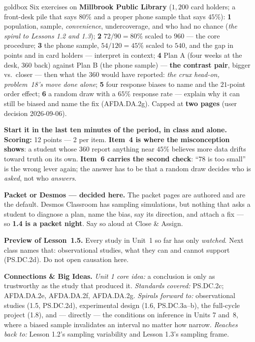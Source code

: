\documentclass[10pt]{article}
\begin{document}
\boxguard
\begin{skillbox}{goldbox}
Six exercises on \textbf{Millbrook Public Library} ($1{,}200$ card holders; a front-desk pile
that says $80\%$ and a proper phone sample that says $45\%$): \textbf{1} population, sample,
\emph{convenience}, undercoverage, and who had no chance (\emph{the spiral to Lessons 1.2 and
1.3}); \textbf{2} $72/90 = 80\%$ scaled to $960$ --- the core procedure; \textbf{3} the phone
sample, $54/120 = 45\%$ scaled to $540$, and the gap in points and in card holders ---
interpret in context; \textbf{4} Plan A (four weeks at the desk, $360$ back) against Plan B
(the phone sample) --- \textbf{the contrast pair}, bigger vs.\ closer --- then what the $360$
would have reported: \emph{the crux head-on, problem~18's move done alone}; \textbf{5} four response biases to name and the
$21$-point order effect; \textbf{6} a random draw with a $65\%$ response rate --- explain why
it can still be biased and name the fix (AFDA.DA.2g). Capped at \textbf{two pages} (user
decision 2026-09-06).

\textbf{Start it in the last ten minutes of the period, in class and alone.} \textbf{Scoring:}
12 points --- 2 per item. \textbf{Item~4 is where the misconception shows}: a student whose
$360$ report anything near $45\%$ believes more data drifts toward truth on its own.
\textbf{Item~6 carries the second check}: ``$78$ is too small'' is the wrong lever again; the
answer has to be that a random draw decides who is \emph{asked}, not who \emph{answers}.

\textbf{Packet or Desmos --- decided here.} The packet pages are authored and are the default.
Desmos Classroom has sampling simulations, but nothing that asks a student to diagnose a
plan, name the bias, say its direction, and attach a fix --- so \textbf{1.4 is a packet
night}. Say so aloud at Close \& Assign.

\textbf{Preview of Lesson~1.5.} Every study in Unit~1 so far has only \emph{watched}. Next
class names that: observational studies, what they can and cannot support (PS.DC.2d). Do not
open causation here.

\textbf{Connections \& Big Ideas.} \textit{Unit 1 core idea:} a conclusion is only as
trustworthy as the study that produced it. \textit{Standards covered:} PS.DC.2c; AFDA.DA.2e,
AFDA.DA.2f, AFDA.DA.2g. \textit{Spirals forward to:} observational studies (1.5, PS.DC.2d), experimental design (1.6, PS.DC.3a--b), the
full-cycle project (1.8), and --- directly --- the conditions on inference in Units 7 and~8, where
a biased sample invalidates an interval no matter how narrow. \textit{Reaches back to:} Lesson
1.2's sampling variability and Lesson 1.3's sampling frame.
\end{skillbox}
\end{document}

